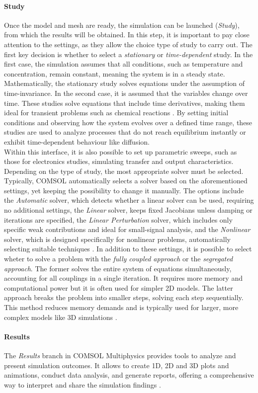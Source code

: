 \paragraph{Study}
Once the model and mesh are ready, the simulation can be launched (\emph{Study}), from which the results will be obtained. In this step, it is important to pay close attention to the settings, as they allow the choice type of study to carry out. The first key decision is whether to select a \emph{stationary} or \emph{time-dependent} study. In the first case, the simulation assumes that all conditions, such as temperature and concentration, remain constant, meaning the system is in a steady state. Mathematically, the stationary study solves equations under the assumption of time-invariance. In the second case, it is assumed that the variables change over time. These studies solve equations that include time derivatives, making them ideal for transient problems such as chemical reactions \citep{comsolCOMSOL_manual}. By setting initial conditions and observing how the system evolves over a defined time range, these studies are used to analyze processes that do not reach equilibrium instantly or exhibit time-dependent behaviour like diffusion.\\
%
Within this interface, it is also possible to set up parametric sweeps, such as those for electronics studies, simulating transfer and output characteristics. \\
%
Depending on the type of study, the most appropriate solver must be selected. Typically, COMSOL automatically selects a solver based on the aforementioned settings, yet keeping the possibility to change it manually. The options include the \emph{Automatic} solver, which detects whether a linear solver can be used, requiring no additional settings, the \emph{Linear} solver, keeps fixed Jacobians unless damping or iterations are specified, the \emph{Linear Perturbation} solver, which includes only specific weak contributions and ideal for small-signal analysis, and the \emph{Nonlinear} solver, which is designed specifically for nonlinear problems, automatically selecting suitable techniques \citep{comsolCOMSOL_manual}.
%
In addition to these settings, it is possible to select wheter to solve a problem with the \emph{fully coupled approach} or the \emph{segregated approach}. The former solves the entire system of equations simultaneously, accounting for all couplings in a single iteration. It requires more memory and computational power but it is often used for simpler 2D models. The latter approach breaks the problem into smaller steps, solving each step sequentially. This method reduces memory demands and is typically used for larger, more complex models like 3D simulations \citep{comsolCOMSOL_manual}.

\paragraph{Results}
The \emph{Results} branch in COMSOL Multiphysics provides tools to analyze and present simulation outcomes. It allows to create 1D, 2D and 3D plots and animations, conduct data analysis, and generate reports, offering a comprehensive way to interpret and share the simulation findings \citep{comsolCOMSOL_manual}.